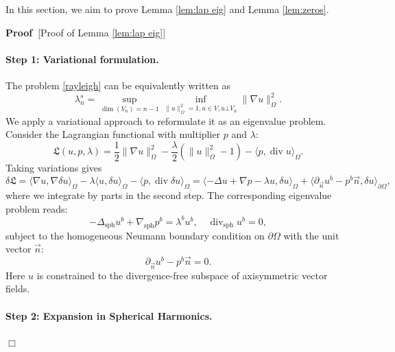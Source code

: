 \documentclass[11pt,a4paper]{article}
\numberwithin{equation}{section}
\newcommand{\tmop}[1]{\ensuremath{\operatorname{#1}}}
\newenvironment{proof}{\noindent\textbf{Proof\ }}{\hspace*{\fill}$\Box$\medskip}
\begin{document}
In this section, we aim to prove Lemma \ref{lem:lap eig} and Lemma
\ref{lem:zeros}.

\begin{proof}[Proof of Lemma \ref{lem:lap eig}]
  \paragraph{Step 1: Variational formulation.}
  
  The problem \eqref{rayleigh} can be equivalently written as
  \[ \lambda_n^s = \sup_{\dim (V_n) = n - 1} \inf_{\|u\|^2_{\Omega} = 1, u \in
     V, u \bot V_n}  \| \nabla u\|^2_{\Omega} . \]
  We apply a variational approach to reformulate it as an eigenvalue problem.
  Consider the Lagrangian functional with multiplier $p$ and $\lambda$:
  \[ \mathfrak{L} (u, p, \lambda) = \frac{1}{2} \| \nabla u\|^2_{\Omega} -
     \frac{\lambda}{2} (\|u\|^2_{\Omega} - 1) - \langle p, \tmop{div} u
     \rangle_{\Omega} . \]
  Taking variations gives
  \[ \delta \mathfrak{L}= \langle \nabla u, \nabla \delta u \rangle_{\Omega} -
     \lambda \langle u, \delta u \rangle_{\Omega} - \langle p, \tmop{div}
     \delta u \rangle_{\Omega} = \langle - \Delta u + \nabla p - \lambda u,
     \delta u \rangle_{\Omega} + \langle \partial_{\vec{n}} u^b - p^b 
     \vec{n}, \delta u \rangle_{\partial \Omega}, \]
  where we integrate by parts in the second step. The corresponding
  eigenvalue problem reads:
  \begin{equation}
    - \Delta_{\tmop{sph}} u^b + \nabla_{\tmop{sph}} p^b = \lambda^b u^b, \quad
    \tmop{div}_{\tmop{sph}} u^b = 0, \label{eq:sph eig U}
  \end{equation}
  subject to the homogeneous Neumann boundary condition on $\partial \Omega$
  with the unit vector $\vec{n}$:
  \[ \partial_{\vec{n}} u^b - p^b  \vec{n} = 0. \]
  Here $u$ is constrained to the divergence-free subspace of axisymmetric
  vector fields.
  
  \paragraph{Step 2: Expansion in Spherical Harmonics.}
  

\end{proof}
\end{document}

